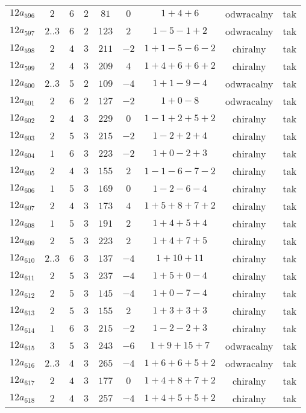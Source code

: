 \begin{longtable}{ccccccccc}
$12a_{596}$ & $2$ & $6$ & $2$ & $81$ & $0$ & $1+4+6$ & odwracalny & tak \\
$12a_{597}$ & $2..3$ & $6$ & $2$ & $123$ & $2$ & $1-5-1+2$ & odwracalny & tak \\
$12a_{598}$ & $2$ & $4$ & $3$ & $211$ & $-2$ & $1+1-5-6-2$ & chiralny & tak \\
$12a_{599}$ & $2$ & $4$ & $3$ & $209$ & $4$ & $1+4+6+6+2$ & chiralny & tak \\
$12a_{600}$ & $2..3$ & $5$ & $2$ & $109$ & $-4$ & $1+1-9-4$ & odwracalny & tak \\
$12a_{601}$ & $2$ & $6$ & $2$ & $127$ & $-2$ & $1+0-8$ & odwracalny & tak \\
$12a_{602}$ & $2$ & $4$ & $3$ & $229$ & $0$ & $1-1+2+5+2$ & chiralny & tak \\
$12a_{603}$ & $2$ & $5$ & $3$ & $215$ & $-2$ & $1-2+2+4$ & chiralny & tak \\
$12a_{604}$ & $1$ & $6$ & $3$ & $223$ & $-2$ & $1+0-2+3$ & chiralny & tak \\
$12a_{605}$ & $2$ & $4$ & $3$ & $155$ & $2$ & $1-1-6-7-2$ & chiralny & tak \\
$12a_{606}$ & $1$ & $5$ & $3$ & $169$ & $0$ & $1-2-6-4$ & chiralny & tak \\
$12a_{607}$ & $2$ & $4$ & $3$ & $173$ & $4$ & $1+5+8+7+2$ & chiralny & tak \\
$12a_{608}$ & $1$ & $5$ & $3$ & $191$ & $2$ & $1+4+5+4$ & chiralny & tak \\
$12a_{609}$ & $2$ & $5$ & $3$ & $223$ & $2$ & $1+4+7+5$ & chiralny & tak \\
$12a_{610}$ & $2..3$ & $6$ & $3$ & $137$ & $-4$ & $1+10+11$ & chiralny & tak \\
$12a_{611}$ & $2$ & $5$ & $3$ & $237$ & $-4$ & $1+5+0-4$ & chiralny & tak \\
$12a_{612}$ & $2$ & $5$ & $3$ & $145$ & $-4$ & $1+0-7-4$ & chiralny & tak \\
$12a_{613}$ & $2$ & $5$ & $3$ & $155$ & $2$ & $1+3+3+3$ & chiralny & tak \\
$12a_{614}$ & $1$ & $6$ & $3$ & $215$ & $-2$ & $1-2-2+3$ & chiralny & tak \\
$12a_{615}$ & $3$ & $5$ & $3$ & $243$ & $-6$ & $1+9+15+7$ & odwracalny & tak \\
$12a_{616}$ & $2..3$ & $4$ & $3$ & $265$ & $-4$ & $1+6+6+5+2$ & odwracalny & tak \\
$12a_{617}$ & $2$ & $4$ & $3$ & $177$ & $0$ & $1+4+8+7+2$ & chiralny & tak \\
$12a_{618}$ & $2$ & $4$ & $3$ & $257$ & $-4$ & $1+4+5+5+2$ & chiralny & tak \\

\end{longtable}
